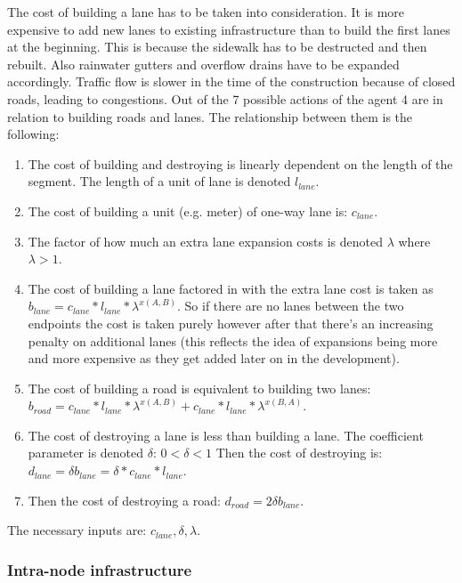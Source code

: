 \documentclass[
]{elteikthesis}[2023/04/10]
\begin{document}
The cost of building a lane has to be taken into consideration. It
is more expensive to add new lanes to existing infrastructure than
to build the first lanes at the beginning. This is because the sidewalk
has to be destructed and then rebuilt. Also rainwater gutters and overflow 
drains have to be expanded accordingly. Traffic flow is slower
in the time of the construction because of closed roads, leading to
congestions. Out of the 7 possible actions of the agent 4 are in relation
to building roads and lanes. The relationship between them is the
following:
\begin{enumerate}
\item The cost of building and destroying is linearly dependent on the length
of the segment. The length of a unit of lane is denoted $l_{lane}.$
\item The cost of building a unit (e.g. meter) of one-way lane is: $c_{lane}$.
\item The factor of how much an extra lane expansion costs is denoted $\lambda$
where $\lambda>1$.
\item The cost of building a lane factored in with the extra lane cost is
taken as $b_{lane}=c_{lane}*l_{lane}*\lambda^{x(A,B)}$. So if there
are no lanes between the two endpoints the cost is taken purely however
after that there's an increasing penalty on additional lanes (this
reflects the idea of expansions being more and more expensive as they
get added later on in the development).
\item The cost of building a road is equivalent to building two lanes: $b_{road}=c_{lane}*l_{lane}*\lambda^{x(A,B)}+c_{lane}*l_{lane}*\lambda^{x(B,A)}$.
\item The cost of destroying a lane is less than building a lane. The coefficient
parameter is denoted $\delta$: $0<\delta<1$ Then the cost of destroying
is: $d_{lane}=\delta b_{lane}=\delta*c_{lane}*l_{lane}$.
\item Then the cost of destroying a road: $d_{road}=2\delta b_{lane}$.
\end{enumerate}
The necessary inputs are: $c_{lane},\delta,\lambda$.

\subsubsection*{Intra-node infrastructure}
\end{document}
